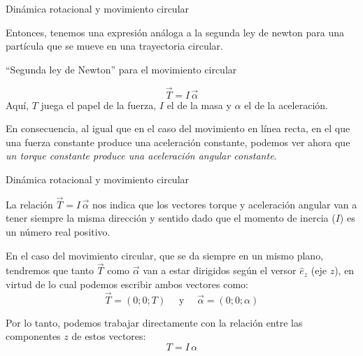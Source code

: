 \documentclass[11pt,handout,aspectratio=1610]{beamer}
\newcommand{\vs}{\vspace{11pt}}
\begin{document}
\begin{frame}{Dinámica rotacional y movimiento circular}
    
    Entonces, tenemos una expresión análoga a la segunda ley de newton para una partícula que se mueve en una trayectoria circular.

    \vs

    \begin{block}{``Segunda ley de Newton'' para el movimiento circular}

    $$\vec{T} = I \, \vec{\alpha}$$ Aquí, $T$ juega el papel de la fuerza, $I$ el de la masa y $\alpha$ el de la aceleración.

\end{block}

    \vs

    En consecuencia, al igual que en el caso del movimiento en línea recta, en el que una fuerza constante produce una aceleración constante, podemos ver ahora que \emph{un torque constante produce una aceleración angular constante}.
    
\end{frame}

\begin{frame}{Dinámica rotacional y movimiento circular}

    La relación $\vec{T} = I \, \vec{\alpha}$ nos indica que los vectores torque y aceleración angular van a tener siempre la misma dirección y sentido dado que el momento de inercia ($I$) es un número real positivo.

    \vs

    En el caso del movimiento circular, que se da siempre en un mismo plano, tendremos que tanto $\vec{T}$ como $\vec{\alpha}$ van a estar dirigidos según el versor $\hat{e}_z$ (eje $z$), en virtud de lo cual podemos escribir ambos vectores como: $$ \vec{T} = \left(0; 0; T\right) \quad \text{ y } \quad \vec{\alpha} = \left(0; 0; \alpha\right) $$

    Por lo tanto, podemos trabajar directamente con la relación entre las componentes $z$ de estos vectores: $$ T = I \, \alpha $$

\end{frame}


\end{document}
